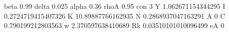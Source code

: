 beta 0.99
delta 0.025
alpha 0.36
rhoA 0.95
con 3
Y 1.062671154344295
I 0.2724719415407326
K 10.89887766162935
N 0.2868937047163291
A 0
C 0.790199212803563
w 2.370597638410689
Rk 0.03510101010096499
eA 0
